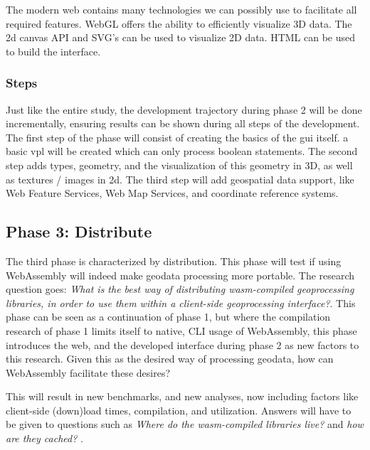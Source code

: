The modern web contains many technologies we can possibly use to facilitate all required features. WebGL offers the ability to efficiently visualize 3D data. The 2d canvas API and SVG's can be used to visualize 2D data. HTML can be used to build the interface.

\subsubsection*{Steps}

Just like the entire study, the development trajectory during phase 2 will be done incrementally, ensuring results can be shown during all steps of the development. 
The first step of the phase will consist of creating the basics of the \ac{gui} itself. a basic \ac{vpl} will be created which can only process boolean statements. The second step adds types, geometry, and the visualization of this geometry in 3D, as well as textures / images in 2d. The third step will add geospatial data support, like Web Feature Services, Web Map Services, and coordinate reference systems.  


\subsection{Phase 3: Distribute}



The third phase is characterized by distribution. 
This phase will test if using WebAssembly will indeed make geodata processing more portable.  
The research question goes: \textit{What is the best way of distributing wasm-compiled geoprocessing libraries, in order to use them within a client-side geoprocessing interface?}. 
This phase can be seen as a continuation of phase 1, but where the compilation research of phase 1 limits itself to native, CLI usage of WebAssembly, this phase introduces the web, and the developed interface during phase 2 as new factors to this research. Given this as the desired way of processing geodata, how can WebAssembly facilitate these desires? 

This will result in new benchmarks, and new analyses, now including factors like client-side (down)load times, compilation, and utilization. Answers will have to be given to questions such as \textit{Where do the wasm-compiled libraries live?} and \textit{ how are they cached? }.

